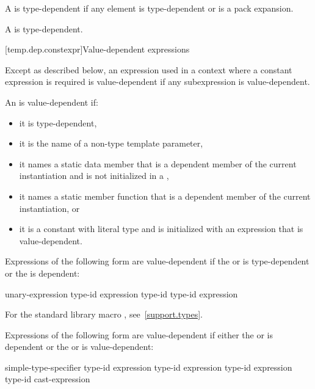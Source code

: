 \pnum
A  is type-dependent if any element is
type-dependent or is a pack expansion.

\pnum
A  is type-dependent.

[temp.dep.constexpr]{Value-dependent expressions}

\pnum
Except as described below, an expression used in a context where a
constant expression is required is value-dependent if any
subexpression is value-dependent.

\pnum
An
is value-dependent if:

\begin{itemize}
\item
it is type-dependent,
\item
it is the name of a non-type template parameter,
\item
it names a static data member that is a dependent member of the current
instantiation and is not initialized in a ,
\item
it names a static member function that is a dependent member of the current
instantiation, or
\item
it is a constant with literal type and is initialized with an
expression that is value-dependent.
\end{itemize}

Expressions of the following form are value-dependent if the
 or 
is type-dependent or the
is dependent:

\begin{ncsimplebnf}
 unary-expression\br
{} type-id \terminal{)}\br
{} expression \terminal{)}\br
{} type-id \terminal{)}\br
{} type-id \terminal{)}\br
{} \terminal{(} expression \terminal{)}
\end{ncsimplebnf}

\begin{note} For the standard library macro ,
see~\ref{support.types}.\end{note}

\pnum
Expressions of the following form are value-dependent if either the
or
is dependent or the
or
is value-dependent:

\begin{ncsimplebnf}
simple-type-specifier \terminal{(}  \terminal{)}\br
{} type-id \terminal{> (} expression \terminal{)}\br
{} type-id \terminal{> (} expression \terminal{)}\br
{} type-id \terminal{> (} expression \terminal{)}\br
\terminal{(} type-id \terminal{)} cast-expression
\end{ncsimplebnf}

